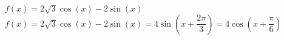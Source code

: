 {$f(x) = 2\sqrt{3} \cos(x) - 2\sin(x)$}
{$f(x) = 2\sqrt{3} \cos(x) - 2\sin(x) = 4\sin\left(x+\dfrac{2\pi}{3}  \right)  = 4\cos\left(x + \dfrac{\pi}{6}\right)$}
